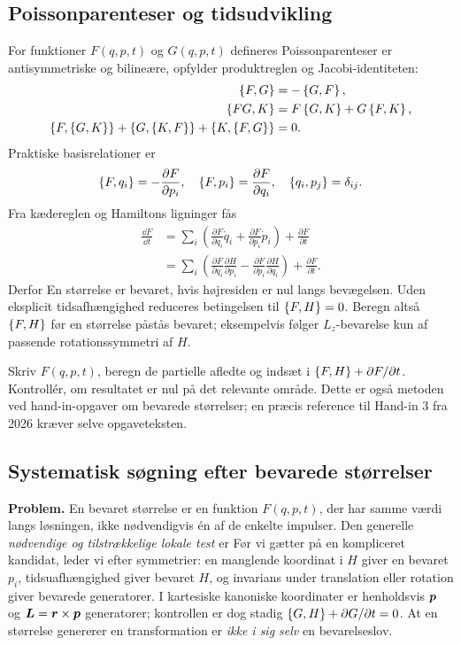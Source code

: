 \subsection{Poissonparenteser og tidsudvikling}\label{sec:pb}
For funktioner $F(q,p,t)$ og $G(q,p,t)$ defineres
Poissonparenteser er antisymmetriske og bilineære, opfylder produktreglen og Jacobi-identiteten:
\[
\begin{aligned}
\left\{F,G\right\}&=-\left\{G,F\right\},\\
\left\{FG,K\right\}&=F\left\{G,K\right\}+G\left\{F,K\right\},\\
\left\{F,\left\{G,K\right\}\right\}+\left\{G,\left\{K,F\right\}\right\}+\left\{K,\left\{F,G\right\}\right\}&=0.
\end{aligned}
\]
Praktiske basisrelationer er
\[
\left\{F,q_i\right\}=-\frac{\partial F}{\partial p_i},\quad
\left\{F,p_i\right\}=\frac{\partial F}{\partial q_i},\quad
\left\{q_i,p_j\right\}=\delta_{ij}.
\]
Fra kædereglen og Hamiltons ligninger fås
\begin{align*}
\frac{\dd F}{\dd t}
&=\sum_i\left(\frac{\partial F}{\partial q_i}\dot q_i+
\frac{\partial F}{\partial p_i}\dot p_i\right)+\frac{\partial F}{\partial t}\\
&=\sum_i\left(\frac{\partial F}{\partial q_i}\frac{\partial H}{\partial p_i}
-\frac{\partial F}{\partial p_i}\frac{\partial H}{\partial q_i}\right)
+\frac{\partial F}{\partial t}.
\end{align*}
Derfor
En størrelse er bevaret, hvis højresiden er nul langs bevægelsen. Uden eksplicit tidsafhængighed reduceres betingelsen til $\left\{F,H\right\}=0$. Beregn altså $\left\{F,H\right\}$ før en størrelse påstås bevaret; eksempelvis følger $L_z$-bevarelse kun af passende rotationssymmetri af $H$.
\begin{method}Skriv $F(q,p,t)$, beregn de partielle afledte og indsæt i $\left\{F,H\right\}+\partial F/\partial t$. Kontrollér, om resultatet er nul på det relevante område. Dette er også metoden ved hand-in-opgaver om bevarede størrelser; en præcis reference til Hand-in 3 fra 2026 kræver selve opgaveteksten.\end{method}

\subsection{Systematisk søgning efter bevarede størrelser}\label{sec:find-conserved}
\textbf{Problem.} En bevaret størrelse er en funktion $F(q,p,t)$, der har samme værdi langs løsningen, ikke nødvendigvis én af de enkelte impulser. Den generelle \emph{nødvendige og tilstrækkelige lokale test} er
Før vi gætter på en kompliceret kandidat, leder vi efter symmetrier: en manglende koordinat i $H$ giver en bevaret $p_i$, tidsuafhængighed giver bevaret $H$, og invarians under translation eller rotation giver bevarede generatorer. I kartesiske kanoniske koordinater er henholdsvis $\boldsymbol{p}$ og $\boldsymbol{L}=\boldsymbol{r}\times\boldsymbol{p}$ generatorer; kontrollen er dog stadig $\left\{G,H\right\}+\partial G/\partial t=0$. At en størrelse genererer en transformation er \emph{ikke i sig selv} en bevarelseslov.

